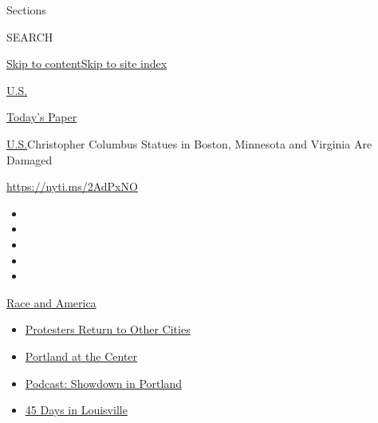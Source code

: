 Sections

SEARCH

\protect\hyperlink{site-content}{Skip to
content}\protect\hyperlink{site-index}{Skip to site index}

\href{https://www.nytimes3xbfgragh.onion/section/us}{U.S.}

\href{https://myaccount.nytimes3xbfgragh.onion/auth/login?response_type=cookie\&client_id=vi}{}

\href{https://www.nytimes3xbfgragh.onion/section/todayspaper}{Today's
Paper}

\href{/section/us}{U.S.}\textbar{}Christopher Columbus Statues in
Boston, Minnesota and Virginia Are Damaged

\url{https://nyti.ms/2AdPxNO}

\begin{itemize}
\item
\item
\item
\item
\item
\end{itemize}

\href{https://www.nytimes3xbfgragh.onion/news-event/george-floyd-protests-minneapolis-new-york-los-angeles?action=click\&pgtype=Article\&state=default\&region=TOP_BANNER\&context=storylines_menu}{Race
and America}

\begin{itemize}
\tightlist
\item
  \href{https://www.nytimes3xbfgragh.onion/2020/07/26/us/protests-portland-seattle-trump.html?action=click\&pgtype=Article\&state=default\&region=TOP_BANNER\&context=storylines_menu}{Protesters
  Return to Other Cities}
\item
  \href{https://www.nytimes3xbfgragh.onion/2020/07/24/us/portland-oregon-protests-white-race.html?action=click\&pgtype=Article\&state=default\&region=TOP_BANNER\&context=storylines_menu}{Portland
  at the Center}
\item
  \href{https://www.nytimes3xbfgragh.onion/2020/07/23/podcasts/the-daily/portland-protests.html?action=click\&pgtype=Article\&state=default\&region=TOP_BANNER\&context=storylines_menu}{Podcast:
  Showdown in Portland}
\item
  \href{https://www.nytimes3xbfgragh.onion/interactive/2020/07/16/us/black-lives-matter-protests-louisville-breonna-taylor.html?action=click\&pgtype=Article\&state=default\&region=TOP_BANNER\&context=storylines_menu}{45
  Days in Louisville}
\end{itemize}

